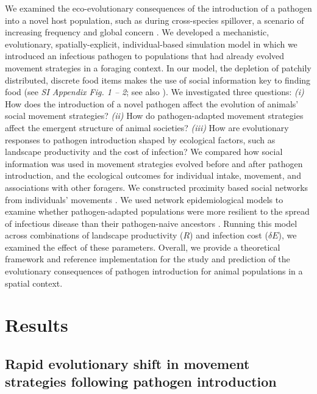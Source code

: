 We examined the eco-evolutionary consequences of the introduction of a pathogen into a novel host population, such as during cross-species spillover, a scenario of increasing frequency and global concern \citep{blehert2009,globconsorth5n82016,fereidouni2019,scheele2019,sanderson2020,carlson2021,kuchipudi2022}.
We developed a mechanistic, evolutionary, spatially-explicit, individual-based simulation model in which we introduced an infectious pathogen to populations that had already evolved movement strategies in a foraging context.
In our model, the depletion of patchily distributed, discrete food items makes the use of social information key to finding food (see \textit{SI Appendix Fig. 1 -- 2}; see also \citealt{gupte2021a}).
We investigated three questions: \textit{(i)} How does the introduction of a novel pathogen affect the evolution of animals' social movement strategies?
\textit{(ii)} How do pathogen-adapted movement strategies affect the emergent structure of animal societies?
\textit{(iii)} How are evolutionary responses to pathogen introduction shaped by ecological factors, such as landscape productivity and the cost of infection?
We compared how social information was used in movement strategies evolved before and after pathogen introduction, and the ecological outcomes for individual intake, movement, and associations with other foragers.
We constructed proximity based social networks from individuals' movements \citep{whitehead2008,farine2015}.
We used network epidemiological models to examine whether pathogen-adapted populations were more resilient to the spread of infectious disease than their pathogen-naive ancestors \citep[][]{stroeymeyt2018}.
Running this model across combinations of landscape productivity ($R$) and infection cost ($\delta E$), we examined the effect of these parameters.
Overall, we provide a theoretical framework and reference implementation for the study and prediction of the evolutionary consequences of pathogen introduction for animal populations in a spatial context.

\section*{Results}

\subsection*{Rapid evolutionary shift in movement strategies following pathogen introduction}


